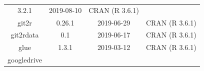 \documentclass[11pt,]{book}
\begin{document}
\begin{longtable}[]{@{}cccc@{}}
\begin{minipage}[t]{0.19\columnwidth}
3.2.1\strut
\end{minipage} & \begin{minipage}[t]{0.16\columnwidth}\centering\strut
2019-08-10\strut
\end{minipage} & \begin{minipage}[t]{0.36\columnwidth}\centering\strut
CRAN (R 3.6.1)\strut
\end{minipage}\tabularnewline
\begin{minipage}[t]{0.18\columnwidth}\centering\strut
git2r\strut
\end{minipage} & \begin{minipage}[t]{0.19\columnwidth}\centering\strut
0.26.1\strut
\end{minipage} & \begin{minipage}[t]{0.16\columnwidth}\centering\strut
2019-06-29\strut
\end{minipage} & \begin{minipage}[t]{0.36\columnwidth}\centering\strut
CRAN (R 3.6.1)\strut
\end{minipage}\tabularnewline
\begin{minipage}[t]{0.18\columnwidth}\centering\strut
git2rdata\strut
\end{minipage} & \begin{minipage}[t]{0.19\columnwidth}\centering\strut
0.1\strut
\end{minipage} & \begin{minipage}[t]{0.16\columnwidth}\centering\strut
2019-06-17\strut
\end{minipage} & \begin{minipage}[t]{0.36\columnwidth}\centering\strut
CRAN (R 3.6.1)\strut
\end{minipage}\tabularnewline
\begin{minipage}[t]{0.18\columnwidth}\centering\strut
glue\strut
\end{minipage} & \begin{minipage}[t]{0.19\columnwidth}\centering\strut
1.3.1\strut
\end{minipage} & \begin{minipage}[t]{0.16\columnwidth}\centering\strut
2019-03-12\strut
\end{minipage} & \begin{minipage}[t]{0.36\columnwidth}\centering\strut
CRAN (R 3.6.1)\strut
\end{minipage}\tabularnewline
\begin{minipage}[t]{0.18\columnwidth}\centering\strut
googledrive\strut
\end{minipage} & \begin{minipage}[t]{0.19\columnwidth}\centering\strut

\end{minipage}
\end{longtable}
\end{document}

